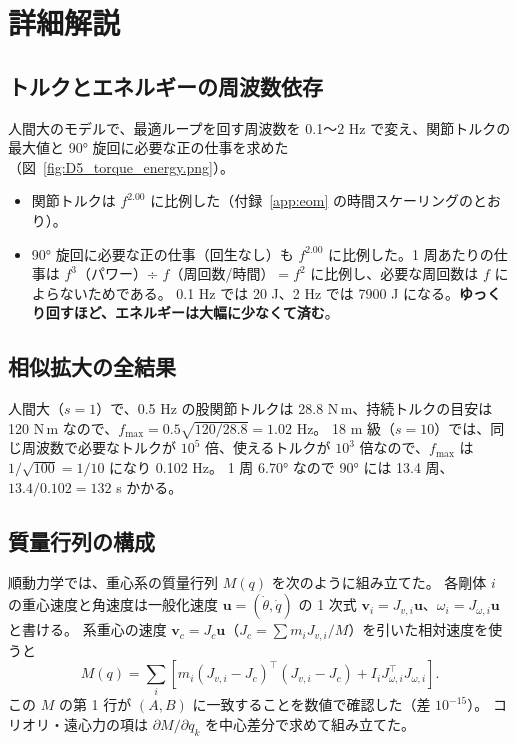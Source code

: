 \section{詳細解説}

\subsection{トルクとエネルギーの周波数依存}

人間大のモデルで、最適ループを回す周波数を 0.1〜2 Hz で変え、関節トルクの最大値と 90° 旋回に必要な正の仕事を求めた（図~\ref{fig:D5_torque_energy.png}）。
\begin{itemize}
\item 関節トルクは $f^{2.00}$ に比例した（付録~\ref{app:eom} の時間スケーリングのとおり）。
\item 90° 旋回に必要な正の仕事（回生なし）も $f^{2.00}$ に比例した。1 周あたりの仕事は $f^3$（パワー）÷ $f$（周回数/時間）$= f^2$ に比例し、必要な周回数は $f$ によらないためである。
  0.1 Hz では 20 J、2 Hz では 7900 J になる。\textbf{ゆっくり回すほど、エネルギーは大幅に少なくて済む}。
\end{itemize}


\subsection{相似拡大の全結果}


\begin{example}[18 m 級の 90° 旋回を見積もる]
人間大（$s=1$）で、0.5 Hz の股関節トルクは 28.8 N\,m、持続トルクの目安は 120 N\,m なので、$f_{\max}=0.5\sqrt{120/28.8}=1.02$ Hz。
18 m 級（$s=10$）では、同じ周波数で必要なトルクが $10^5$ 倍、使えるトルクが $10^3$ 倍なので、$f_{\max}$ は $1/\sqrt{100}=1/10$ になり 0.102 Hz。
1 周 6.70° なので 90° には 13.4 周、$13.4/0.102 = 132$ s かかる。
\end{example}

\subsection{質量行列の構成}

順動力学では、重心系の質量行列 $M(q)$ を次のように組み立てた。
各剛体 $i$ の重心速度と角速度は一般化速度 $\bm u=(\dot\theta,\dot q)$ の 1 次式 $\bm v_i = J_{v,i}\bm u$、$\omega_i = J_{\omega,i}\bm u$ と書ける。
系重心の速度 $\bm v_c = J_c\bm u$（$J_c = \sum m_iJ_{v,i}/M$）を引いた相対速度を使うと
\begin{equation}
M(q) = \sum_i\left[m_i(J_{v,i}-J_c)^\top(J_{v,i}-J_c) + I_iJ_{\omega,i}^\top J_{\omega,i}\right].
\end{equation}
この $M$ の第 1 行が $(A, B)$ に一致することを数値で確認した（差 $10^{-15}$）。
コリオリ・遠心力の項は $\partial M/\partial q_k$ を中心差分で求めて組み立てた。

